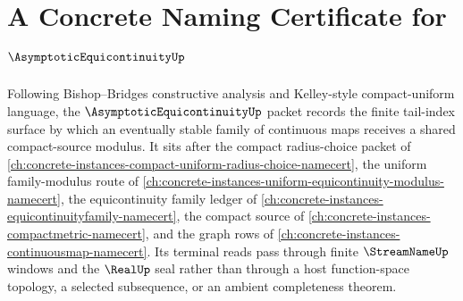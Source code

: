 \chapter{A Concrete Naming Certificate for $\AsymptoticEquicontinuityUp$}
\label{ch:concrete-instances-asymptotic-equicontinuity-namecert}

Following Bishop--Bridges constructive analysis and Kelley-style compact-uniform language, the $\AsymptoticEquicontinuityUp$ packet records the finite tail-index surface by which an eventually stable family of continuous maps receives a shared compact-source modulus. It sits after the compact radius-choice packet of \autoref{ch:concrete-instances-compact-uniform-radius-choice-namecert}, the uniform family-modulus route of \autoref{ch:concrete-instances-uniform-equicontinuity-modulus-namecert}, the equicontinuity family ledger of \autoref{ch:concrete-instances-equicontinuityfamily-namecert}, the compact source of \autoref{ch:concrete-instances-compactmetric-namecert}, and the graph rows of \autoref{ch:concrete-instances-continuousmap-namecert}. Its terminal reads pass through finite $\StreamNameUp$ windows and the $\RealUp$ seal rather than through a host function-space topology, a selected subsequence, or an ambient completeness theorem.

